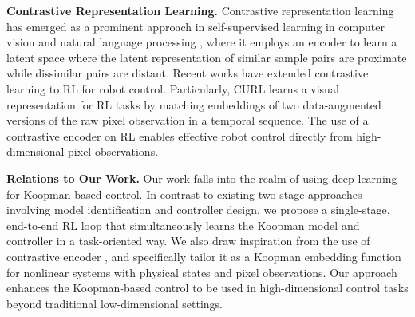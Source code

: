 \documentclass{article}
\begin{document}
\textbf{Contrastive Representation Learning.} 
Contrastive representation learning has emerged as a prominent approach in self-supervised learning in computer vision and natural language processing \cite{chopra2005learning, oord2018representation, chen2020simple, he2020momentum, kotar2021contrasting, zhao2023arcl, LilanContrastive}, where it employs an encoder to learn a latent space where the latent representation of similar sample pairs are proximate while dissimilar pairs are distant. Recent works have extended contrastive learning to RL for robot control. Particularly, CURL \cite{laskin2020curl} learns a visual representation for RL tasks by matching embeddings of two data-augmented versions of the raw pixel observation in a temporal sequence. The use of a contrastive encoder on RL enables effective robot control directly from high-dimensional pixel observations.

\textbf{Relations to Our Work.}
Our work falls into the realm of using deep learning for Koopman-based control. In contrast to existing two-stage approaches \cite{han2020deep, shi2022deep} involving model identification and controller design, we propose a single-stage, end-to-end RL loop that simultaneously learns the Koopman model and controller in a task-oriented way. We also draw inspiration from the use of contrastive encoder \cite{laskin2020curl}, and specifically tailor it as a Koopman embedding function for nonlinear systems with physical states and pixel observations. Our approach enhances the Koopman-based control to be used in high-dimensional control tasks beyond traditional low-dimensional settings.
\end{document}
